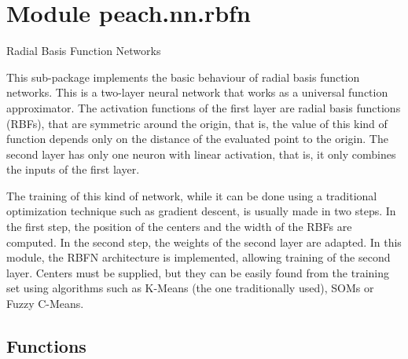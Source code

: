 %
%
%


\section{Module peach.nn.rbfn}

    \label{peach:nn:rbfn}

Radial Basis Function Networks

This sub-package implements the basic behaviour of radial basis function
networks. This is a two-layer neural network that works as a universal function
approximator. The activation functions of the first layer are radial basis
functions (RBFs), that are symmetric around the origin, that is, the value of
this kind of function depends only on the distance of the evaluated point to the
origin. The second layer has only one neuron with linear activation, that is, it
only combines the inputs of the first layer.

The training of this kind of network, while it can be done using a traditional
optimization technique such as gradient descent, is usually made in two steps.
In the first step, the position of the centers and the width of the RBFs are
computed. In the second step, the weights of the second layer are adapted. In
this module, the RBFN architecture is implemented, allowing training of the
second layer. Centers must be supplied, but they can be easily found from the
training set using algorithms such as K-Means (the one traditionally used),
SOMs or Fuzzy C-Means.


  \subsection{Functions}

    \label{peach:nn:rbfn:randn}

